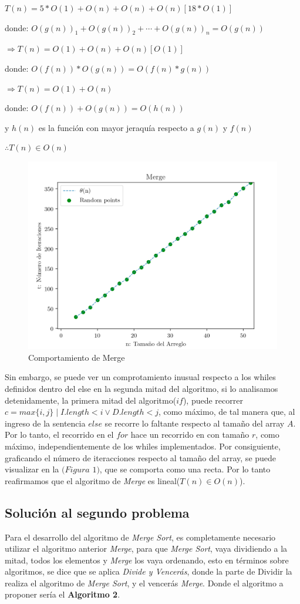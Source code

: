 \documentclass[12pt,twoside]{article}
\begin{document}
\centerline{$T(n) = 5*O(1)+O(n)+O(n)+O(n)[18*O(1)]$}
\centerline{}
\centerline{donde: $O(g(n))_{1} + O(g(n))_{2}+\cdots+O(g(n))_n = O(g(n))$}
\centerline{}
\centerline{$\Rightarrow T(n) = O(1) + O(n)+ O(n)[O(1)]$}
\centerline{}
\centerline{donde: $O(f(n)) * O(g(n))= O(f(n)*g(n))$}
\centerline{}
\centerline{$\Rightarrow T(n) = O(1) + O(n)$}
\centerline{}
\centerline{donde: $O(f(n)) + O(g(n)) = O(h(n))$}
\centerline{y $h(n)$ es la funci\'on con mayor jeraqu\'ia respecto a $g(n)$ y $f(n)$}
\centerline{}
\centerline{$\therefore T(n) \in O(n)$}

\begin{figure}
  \centering
    \includegraphics[height=0.5\textwidth]{Figure1}
  \caption{Comportamiento de Merge}
  \label{fig:ejemplo1}
\end{figure}

Sin embargo, se puede ver un comprotamiento inusual respecto a los whiles definidos dentro del else en la segunda mitad del algoritmo,
si lo analisamos detenidamente, la primera mitad del algoritmo($if$), puede recorrer $c = max\{i, j\} \mid I.length < i \lor D.length < j$,
como máximo, de tal manera que, al ingreso de la sentencia $else$ se recorre lo faltante respecto al tamaño del array $A$. Por lo tanto,
el recorrido en el $for$ hace un recorrido en con tamaño $r$, como máximo, independientemente de los whiles implementados. Por consiguiente,
graficando el número de iteracciones respecto al tamaño del array, se puede visualizar en la $(Figura$ $1)$, que se comporta como una recta.
Por lo tanto reafirmamos que el algoritmo de \textit{Merge} es lineal($T(n) \in O(n)$).


\subsection{\textbf{Soluci\'on al segundo problema}}

Para el desarrollo del algoritmo de \textit{Merge Sort}, es completamente necesario utilizar el algoritmo anterior \textit{Merge}, para que 
\textit{Merge Sort}, vaya dividiendo a la mitad, todos los elementos y \textit{Merge} los vaya ordenando, esto en términos sobre 
algoritmos, se dice que se aplica \textit{Divide y Vencerás}, donde la parte de Dividir la realiza el algoritmo de \textit{Merge Sort}, 
y el vencerás \textit{Merge}. Donde el algoritmo a proponer sería el \textbf{Algoritmo 2}.
\end{document}
